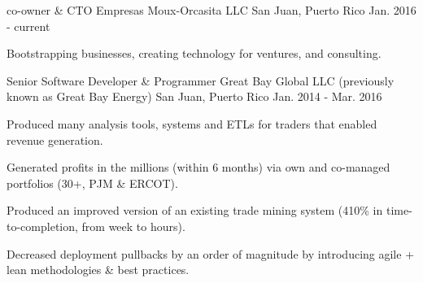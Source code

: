 

\begin{cventries}

  \cventry
    {co-owner \& CTO} %
    {Empresas Moux-Orcasita LLC} %
    {San Juan, Puerto Rico} %
    {Jan. 2016 - current} %
    {
      \begin{cvitems} %
	    \item {Bootstrapping businesses, creating technology for ventures, and consulting.}
      \end{cvitems}
    }

  \cventry
	{Senior Software Developer \& Programmer} %
	{Great Bay Global LLC (previously known as Great Bay Energy)} %
    {San Juan, Puerto Rico} %
    {Jan. 2014 - Mar. 2016} %
    {
      \begin{cvitems} %
		\item{Produced many analysis tools, systems and ETLs for traders that enabled revenue generation.}
	  \item {Generated profits in the millions (within 6 months) via own and co-managed portfolios (30+, PJM \& ERCOT).}
		\item{Produced an improved version of an existing trade mining system (410\% in time-to-completion, from week to hours).}
		\item{Decreased deployment pullbacks by an order of magnitude by introducing agile + lean methodologies \& best practices.}
      \end{cvitems}
    }


\end{cventries}
